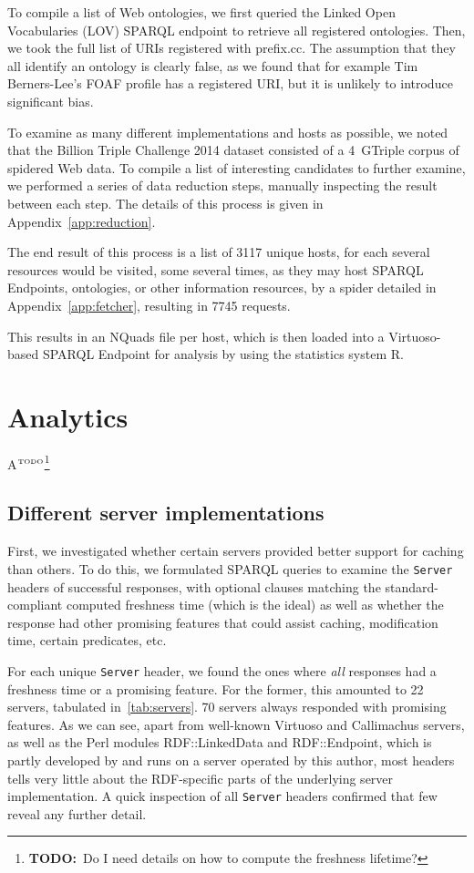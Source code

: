 \documentclass{llncs}
\newcommand{\httph}[1]{\texttt{#1}}
\newcommand{\todo}[1]{\ensuremath{^{\textrm{\tiny{TODO}\normalsize}}}\footnote{\textbf{TODO:}~#1}}
\begin{document}
To compile a list of Web ontologies, we first queried the Linked Open
Vocabularies (LOV) \cite{doi:10.1108/LHT-03-2013-0027} SPARQL endpoint
to retrieve all registered ontologies. Then, we took the full list of
URIs registered with prefix.cc. The assumption that they all identify
an ontology is clearly false, as we found that for example Tim
Berners-Lee's FOAF profile has a registered URI, but it is unlikely to
introduce significant bias.

To examine as many different implementations and hosts as possible, we
noted that the Billion Triple Challenge 2014 \cite{btc-2014} dataset
consisted of a 4~GTriple corpus of spidered Web data. To compile a
list of interesting candidates to further examine, we performed a
series of data reduction steps, manually inspecting the result between
each step. The details of this process is given in
Appendix~\ref{app:reduction}.

The end result of this process is a list of 3117 unique hosts, for
each several resources would be visited, some several times, as they
may host SPARQL Endpoints, ontologies, or other information resources,
by a spider detailed in Appendix~\ref{app:fetcher}, resulting in 7745
requests.

This results in an NQuads file per host, which is then loaded into a
Virtuoso-based SPARQL Endpoint for analysis by using the statistics
system R\cite{kn:r}.

\section{Analytics}

A\todo{Do I need details on how to compute the freshness lifetime?}

\subsection{Different server implementations}

First, we investigated whether certain servers provided better support
for caching than others. To do this, we formulated SPARQL queries to
examine the \httph{Server} headers of successful responses, with
optional clauses matching the standard-compliant computed freshness
time (which is the ideal) as well as whether the response had other
promising features that could assist caching, modification time,
certain predicates, etc.

For each unique \httph{Server} header, we found the ones where
\emph{all} responses had a freshness time or a promising feature. For
the former, this amounted to 22 servers, tabulated
in~\ref{tab:servers}. 70 servers always responded with promising
features. As we can see, apart from well-known Virtuoso and
Callimachus servers, as well as the Perl modules RDF::LinkedData and
RDF::Endpoint, which is partly developed by and runs on a server
operated by this author, most headers tells very little about the
RDF-specific parts of the underlying server implementation. A quick
inspection of all \httph{Server} headers confirmed that few reveal any
further detail.
\end{document}
